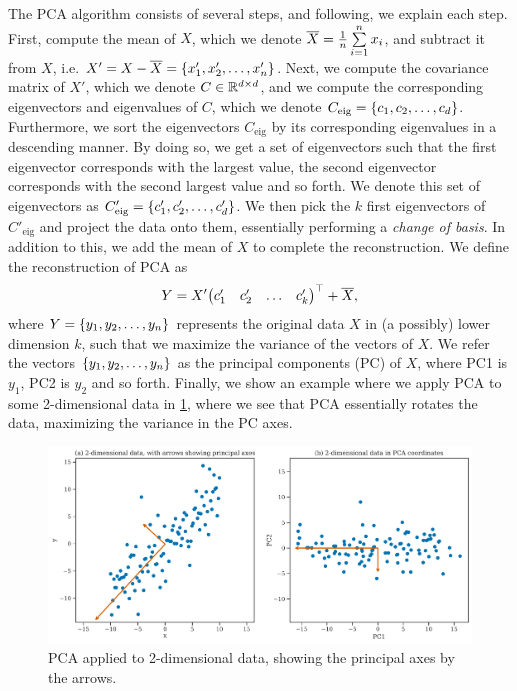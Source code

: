 The PCA algorithm consists of several steps, and following, we explain each step. First, compute the mean of $X$, which we denote $\overline{X} = \frac{1}{n} \sum\limits_{i=1}^{n} x_i$, and subtract it from $X$, i.e. $X' = X - \overline{X} = \left\{x'_1, x'_2, \ldots, x'_n\right\}$. Next, we compute the covariance matrix of $X'$, which we denote $C \in \mathbb{R}^{d \times d}$, and we compute the corresponding eigenvectors and eigenvalues of $C$, which we denote $C_\text{eig} = \left\{c_1, c_2, \ldots, c_d\right\}$. Furthermore, we sort the eigenvectors $C_\text{eig}$ by its corresponding eigenvalues in a descending manner. By doing so, we get a set of eigenvectors such that the first eigenvector corresponds with the largest value, the second eigenvector corresponds with the second largest value and so forth. We denote this set of eigenvectors as $C'_\text{eig} = \left\{c'_1, c'_2, \ldots, c'_d\right\}$. We then pick the $k$ first eigenvectors of $C'_\text{eig}$ and project the data onto them, essentially performing a \textit{change of basis}. In addition to this, we add the mean of $X$ to complete the reconstruction. We define the reconstruction of PCA as
\begin{align}
    Y = X' {\begin{pmatrix}
    c'_1 & c'_2 & \ldots & c'_k
    \end{pmatrix}}^\top + \overline{X},
    \label{eqn:pca-projection}
\end{align}
where $Y = \left\{y_1, y_2, \ldots, y_n\right\}$ represents the original data $X$ in (a possibly) lower dimension $k$, such that we maximize the variance of the vectors of $X$. We refer the vectors $\left\{y_1, y_2, \ldots, y_n\right\}$ as the principal components (PC) of $X$, where PC1 is $y_1$, PC2 is $y_2$ and so forth. Finally, we show an example where we apply PCA to some 2-dimensional data in \cref{fig:pca-2d-example}, where we see that PCA essentially rotates the data, maximizing the variance in the PC axes.
\begin{figure}[H]
    \centering
    \includegraphics[width=\textwidth]{thesis/figures/pca-2d-example.pdf}
    \caption{PCA applied to 2-dimensional data, showing the principal axes by the arrows.}
    \label{fig:pca-2d-example}
\end{figure}


